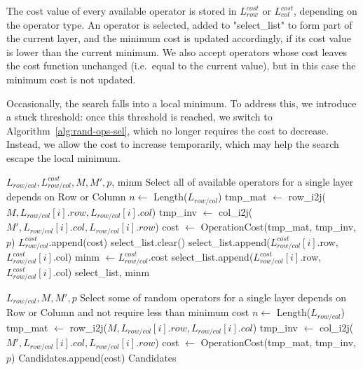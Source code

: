 The cost value of every available operator is stored in $L_{row}^{cost}$ or $L_{col}^{cost}$, depending on the operator type. An operator is selected, added to "select\_list" to form part of the current layer, and the minimum cost is updated accordingly, if its cost value is lower than the current minimum. We also accept operators whose cost leaves the cost function unchanged (i.e.\ equal to the current value), but in this case the minimum cost is not updated.

Occasionally, the search falls into a local minimum. To address this, we introduce a stuck threshold: once this threshold is reached, we switch to Algorithm~\ref{alg:rand-ops-sel}, which no longer requires the cost to decrease. Instead, we allow the cost to increase temporarily, which may help the search escape the local minimum.

\begin{algorithm}[htbp]
\caption{Ops\_Sel}
\label{alg:ops-sel}
\begin{algorithmic}[1]
\Require $L_{row/col}, L_{row/col}^{cost}, M, M', p$, minm
\Ensure Select all of available operators for a single layer depends on Row or Column
\State $n \leftarrow$ Length($L_{row/col}$)
	\State tmp\_mat $\leftarrow$ row\_i2j($M, L_{row/col}[i].row, L_{row/col}[i].col$) 
	\State tmp\_inv $\leftarrow$ col\_i2j($M', L_{row/col}[i].col, L_{row/col}[i].row$) 
	\State cost $\leftarrow$ OperationCost(tmp\_mat, tmp\_inv, $p$)
	\State $L_{row/col}^{cost}$.append(cost)
\EndFor
{}
		\State select\_list.clear()
		\State select\_list.append($L_{row/col}^{cost}[i]$.row, $L_{row/col}^{cost}[i]$.col)
		\State minm $\leftarrow L_{row/col}^{cost}$.cost
		\State select\_list.append($L_{row/col}^{cost}[i]$.row, $L_{row/col}^{cost}[i]$.col)
	\EndIf
\EndFor
\State \Return select\_list, minm
\end{algorithmic}
\end{algorithm}

\begin{algorithm}[htbp]
\caption{Rand\_Ops\_Sel}
\label{alg:rand-ops-sel}
\begin{algorithmic}[1]
\Require $L_{row/col}, M, M', p$
\Ensure Select some of random operators for a single layer depends on Row or Column and not require less than minimum cost
\State $n \leftarrow$ Length($L_{row/col}$)
	\State tmp\_mat $\leftarrow$ row\_i2j($M, L_{row/col}[i].row, L_{row/col}[i].col$) 
	\State tmp\_inv $\leftarrow$ col\_i2j($M', L_{row/col}[i].col, L_{row/col}[i].row$) 
	\State cost $\leftarrow$ OperationCost(tmp\_mat, tmp\_inv, $p$)
	\State Candidates.append(cost)
\EndFor
\State \Return Candidates
\end{algorithmic}
\end{algorithm}

